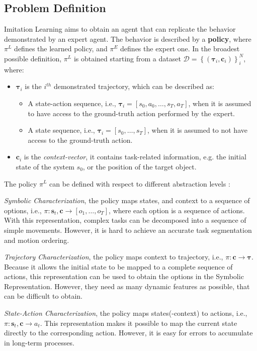 \subsection{Problem Definition}
\label{sec:problem_formulation}
Imitation Learning aims to obtain an agent that can replicate the behavior demonstrated by an expert agent. The behavior is described by a \textbf{policy}, where $\pi^{L}$ defines the learned policy, and $\pi^{E}$ defines the expert one. In the broadest possible definition, $\pi^{L}$ is obtained starting from a dataset $\mathcal{D}=\left \{ \left ( \boldsymbol{\tau}_{i}, \boldsymbol{c}_{i}\right ) \right \}_{i}^{N}$, where:
\begin{itemize}
    \item $\boldsymbol{\tau}_{i}$ is the $i^{th}$ demonstrated trajectory, which can be described as:
        \begin{itemize}
            \item A state-action sequence, i.e., $\boldsymbol{\tau}_{i} = [s_{0}, a_{0}, \dots, s_{T}, a_{T}]$, when it is assumed to have access to the ground-truth action performed by the expert.
            \item A state sequence, i.e., $\boldsymbol{\tau}_{i} = [s_{0}, \dots, s_{T}]$, when it is assumed to not have access to the ground-truth action.
        \end{itemize}    
    \item $\boldsymbol{c}_{i}$ is the \textit{context-vector}, it contains task-related information, e.g. the initial state of the system $s_{0}$, or the position of the target object.
\end{itemize}
The policy $\pi^{L}$ can be defined with respect to different abstraction levels \cite{fang2019survey,osa2018algorithmic}:   
\begin{enumerate*}[label=(\textbf{\alph*})]
    \item \textit{Symbolic Characterization}, the policy maps states, and context to a sequence of options, i.e., $\pi: \textbf{s}_{t}, \textbf{c} \rightarrow [o_1, \dots, o_T]$, where each option is a sequence of actions. With this representation, complex tasks can be decomposed into a sequence of simple movements. However, it is hard to achieve an accurate task segmentation and motion ordering.
    \item \textit{Trajectory Characterization}, the policy maps context to trajectory, i.e., $\pi: \mathbf{c} \rightarrow \boldsymbol{\tau}$. Because it allows the initial state to be mapped to a complete sequence of actions, this representation can be used to obtain the options in the Symbolic Representation. However, they need as many dynamic features as possible, that can be difficult to obtain.
    \item \textit{State-Action Characterization}, the policy maps states(-context) to actions, i.e., $\pi: \textbf{s}_{t}, \textbf{c} \rightarrow a_{t}$. This representation makes it possible to map the current state directly to the corresponding action. However, it is easy for errors to accumulate in long-term processes.
\end{enumerate*} 
